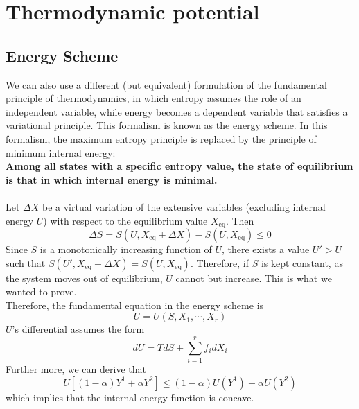 \section{Thermodynamic potential}
\subsection{Energy Scheme}
We can also use a different (but equivalent) formulation of the fundamental principle of thermodynamics, in which entropy assumes the role of an independent variable, while energy becomes a dependent variable that satisfies a variational principle. This formalism is known as the energy scheme. In this formalism, the maximum entropy principle is replaced by the principle of minimum internal energy:
\\ 
\textbf{Among all states with a specific entropy value, the state of equilibrium is that in which internal energy is minimal.}
\\ \\
Let $\Delta X$ be a virtual variation of the extensive variables (excluding internal energy $U$) with respect to the equilibrium value $X_{\mathrm{eq}}$. Then
\[\Delta S = S(U,X_{\mathrm{eq}} + \Delta X) - S(U,X_{\mathrm{eq}} ) \leq 0\]
Since $S$ is a monotonically increasing function of $U$, there exists a value $U' > U$ such that $S(U',X_{\mathrm{eq}} + \Delta X) = S(U, X_{\mathrm{eq}})$. Therefore, if $S$ is kept constant, as the system moves out of equilibrium, $U$ cannot but increase. This is what we wanted to prove.
\\
Therefore, the fundamental equation in the energy scheme is
\[U = U(S,X_1,\cdots,X_r)\]
$U$'s differential assumes the form
\[dU = TdS + \sum_{i=1}^r f_i dX_i\]
Further more, we can derive that
\[ U[(1-\alpha)Y^1 + \alpha Y^2] \leq (1 - \alpha)U(Y^1) + \alpha U(Y^2) \]
which implies that the internal energy function is concave.

